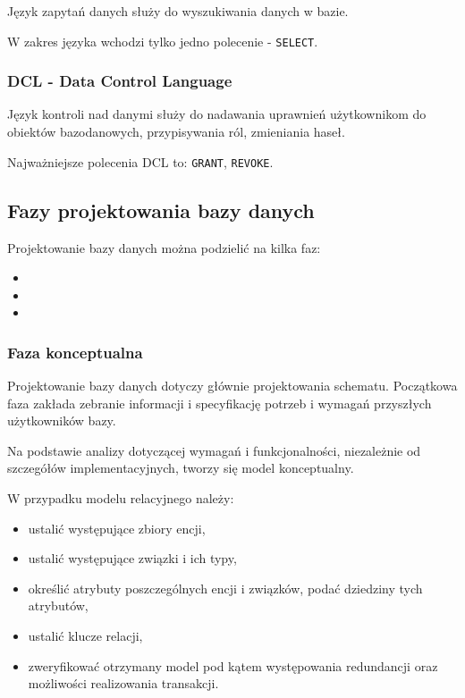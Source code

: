 Język zapytań danych służy do wyszukiwania danych w bazie.

W zakres języka wchodzi tylko jedno polecenie - \texttt{SELECT}.

\subsubsection{DCL - Data Control Language}

Język kontroli nad danymi służy do nadawania uprawnień użytkownikom do obiektów bazodanowych, przypisywania ról, zmieniania haseł.

Najważniejsze polecenia DCL to: \texttt{GRANT}, \texttt{REVOKE}.

\subsection{Fazy projektowania bazy danych}

Projektowanie bazy danych można podzielić na kilka faz:
\begin{itemize}
    \item {}
    \item {}
    \item {}
\end{itemize}

\subsubsection{Faza konceptualna}

Projektowanie bazy danych dotyczy głównie projektowania schematu. Początkowa faza zakłada zebranie informacji i specyfikację potrzeb i wymagań przyszłych użytkowników bazy.

Na podstawie analizy dotyczącej wymagań i funkcjonalności, niezależnie od szczegółów implementacyjnych, tworzy się model konceptualny.

W przypadku modelu relacyjnego należy:
\begin{itemize}
    \item ustalić występujące zbiory encji,
    \item ustalić występujące związki i ich typy,
    \item określić atrybuty poszczególnych encji i związków, podać dziedziny tych atrybutów,
    \item ustalić klucze relacji,
    \item zweryfikować otrzymany model pod kątem występowania redundancji oraz możliwości realizowania transakcji.
\end{itemize}

